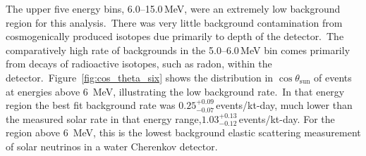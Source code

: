 The upper five energy bins, \numrange[range-phrase=--]{6.0}{15.0}\,MeV, were an
extremely low background region for this analysis.\
There was very little background contamination from
cosmogenically produced isotopes due primarily to depth of the detector.\
The comparatively high rate of backgrounds in the \numrange[range-phrase=--]{5.0}{6.0}\,MeV bin
comes primarily from decays of radioactive isotopes, such as radon, within the detector.\
Figure~\ref{fig:cos_theta_six} shows the distribution in $\cos\theta_\text{{sun}}$ of events at
energies above 6~MeV, illustrating the low background rate.\
In that energy region the best fit background rate was $0.25^{+0.09}_{-0.07}$\,events/kt-day, much
lower than the measured solar rate in that energy range,$1.03^{+0.13}_{-0.12}$\,events/kt-day.
For the region above 6~MeV, this is the lowest
background elastic scattering measurement of solar neutrinos in a water
Cherenkov detector.\

%
